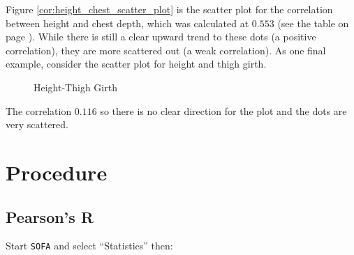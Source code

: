 Figure \ref{cor:height_chest_scatter_plot} is the scatter plot for the correlation between height and chest depth, which was calculated at $ 0.553 $ (see the table on page \pageref{cor:table01}). While there is still a clear upward trend to these dots (a positive correlation), they are more scattered out (a weak correlation). As one final example, consider the scatter plot for height and thigh girth. 

\begin{figure}[H]
  \begin{center}
    \caption{Height-Thigh Girth}
  \end{center}
\end{figure}

The correlation $ 0.116 $ so there is no clear direction for the plot and the dots are very scattered.

\section{Procedure}

\subsection{Pearson's R}\label{cor:pearsons_r_proc}

Start \texttt{SOFA} and select ``Statistics'' then:

